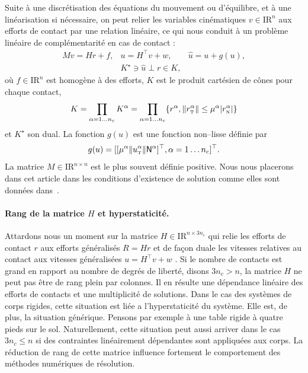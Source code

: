 \documentclass{CSMA2017}
\def\RR{\nbR}
\def\nbR{\ensuremath{\mathrm{I\!R}}} %
\def\n{{\hbox{\tiny{N}}}}
\def\t{{\hbox{\tiny{T}}}}
\begin{document}
Suite à une discrétisation des équations du mouvement ou d'équilibre, et à une linéarisation si nécessaire, on peut relier les variables cinématiques $ {v} \in \RR^n$ aux efforts de contact par une relation linéaire, ce qui nous conduit à un  problème linéaire de complémentarité en cas de contact :
\begin{equation}\label{eq:soccp1-intro}
  \begin{array}{rcl}
    M v = {H} {r} + {f}, &
    u = H^\top v + w,  &
    \hat u = u + g(u) ,\\[1mm]
    &    K^\star \ni {\hat u} \perp r \in K,&
  \end{array}
\end{equation}
où $f\in \RR^n$ est homogène à des efforts, $K$ est le produit cartésien de cônes pour chaque contact, 
\begin{equation}
  \label{eq:CC}
  K = \prod_{\alpha=1\ldots n_c} K^{\alpha}  = \prod_{\alpha=1\ldots n_c} \{r^\alpha, \|r^\alpha_\t \| \leq \mu^\alpha |r^\alpha_\n| \}
\end{equation}
et $K^\star$ son dual. La fonction $g(u)$ est une fonction non--lisse définie par 
\begin{equation}
g(u) = [[\mu^\alpha  \|u^\alpha_\t\| {\sf N}^\alpha]^\top, \alpha = 1\ldots n_c]^\top\label{eq:gg}. 
\end{equation}
La matrice $M \in \RR^{n \times n}$ est le plus souvent définie positive. Nous nous placerons dans cet article dans les conditions d'existence de solution comme elles sont données dans~\cite{Klarbring.Pang1998,Acary.ea_ZAMM2011}.


\paragraph{Rang de la matrice $H$ et hyperstaticité.} 
Attardons nous un moment sur la matrice $H \in \RR^{n\times 3n_c} $ qui relie les efforts de contact $r$ aux efforts généralisés $R=H r$ et de façon duale les vitesses relatives au contact aux vitesses généralisées $u = H^\top v +w$ . Si le nombre de contacts est grand en rapport au nombre de degrés de liberté, disons $3 n_c > n$, la matrice $H$ ne peut pas être de rang plein par colonnes. Il en résulte une dépendance linéaire des efforts de contacts et une multiplicité de solutions. Dans le cas des systèmes de corps rigides, cette situation est liée a l'hyperstaticité du système. Elle est, de plus, la situation générique. Pensons par exemple à une table rigide à quatre pieds sur le sol. Naturellement, cette situation peut aussi arriver dans le cas $3 n_c \leq  n$ si des contraintes linéairement dépendantes sont appliquées aux corps. La réduction de rang de cette matrice influence fortement le comportement des méthodes numériques de résolution. 
\end{document}
